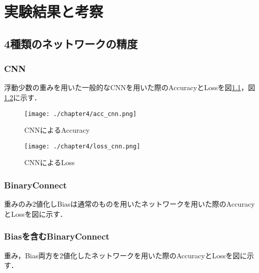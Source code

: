 \chapter{実験結果と考察}

\section{4種類のネットワークの精度}

\subsection{CNN}
浮動少数の重みを用いた一般的なCNNを用いた際のAccuracyとLossを図\ref{fig_cnn_acc}，図\ref{fig_cnn_loss}に示す．
\begin{figure}[]
    \begin{center}
      \texttt{[image: ./chapter4/acc\_cnn.png]}
      \caption{CNNによるAccuracy}
      \label{fig_cnn_acc}
    \end{center}
\end{figure}
\begin{figure}[]
    \begin{center}
      \texttt{[image: ./chapter4/loss\_cnn.png]}
      \caption{CNNによるLoss}
      \label{fig_cnn_loss}
    \end{center}
\end{figure}

\subsection{BinaryConnect}
重みのみ2値化しBiasは通常のものを用いたネットワークを用いた際のAccuracyとLossを図に示す．

\subsection{Biasを含むBinaryConnect}
重み，Bias両方を2値化したネットワークを用いた際のAccuracyとLossを図に示す．